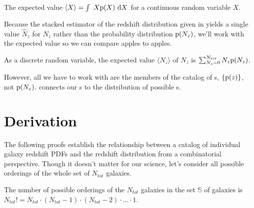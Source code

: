 

\begin{definition}\label{def:expected}
	The expected value $\langle X \rangle = \int\ X\mathrm{p}(X)\ \mathrm{d} X$ for a continuous random variable $X$.
\end{definition}

Because the stacked estimator of the redshift distribution given in  yields a single value $\hat{N}_{z}$ for $N_{z}$ rather than the probability distribution $\mathrm{p}(N_{z})$, we'll work with the expected value so we can compare apples to apples.

\begin{lemma}\label{lem:expectednz}
	As a discrete random variable, the expected value $\langle N_{z} \rangle$ of $N_{z}$ is $\sum_{N_{z} = 0}^{N_{tot}} N_{z}\mathrm{p}(N_{z})$.
\end{lemma}

However, all we have to work with are the members of the catalog of \pzpdf s, $\{\mathrm{p}(z)\}$, not $\mathrm{p}(N_{z})$.
 connects our \pzpdf s to the distribution of possible \Nz s.

\section{Derivation}

The following proofs establish the relationship between a catalog of individual galaxy redshift PDFs and the redshift distribution from a combinatorial perspective.
Though it doesn't matter for our science, let's consider all possible orderings of the whole set of $N_{tot}$ galaxies.

\begin{definition}\label{def:permutations}
	The number of possible orderings of the $N_{tot}$ galaxies in the set $\mathbb{S}$ of galaxies is $N_{tot}! = N_{tot} \cdot (N_{tot} - 1) \cdot (N_{tot} - 2) \cdot \dots \cdot 1$.
\end{definition}


